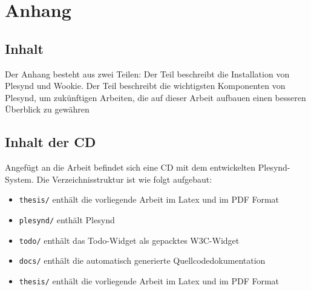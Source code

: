 
\chapter{Anhang}
\label{AppendixA}

\section{Inhalt} 
Der Anhang besteht aus zwei Teilen: Der Teil  beschreibt die Installation von Plesynd und Wookie. Der Teil  beschreibt die wichtigsten Komponenten von Plesynd, um zukünftigen Arbeiten, die auf dieser Arbeit aufbauen einen besseren Überblick zu gewähren

\section{Inhalt der CD}
Angefügt an die Arbeit befindet sich eine CD mit dem entwickelten Plesynd-System. Die Verzeichnisstruktur ist wie folgt aufgebaut:
\begin{itemize}
 \item \texttt{thesis/} enthält die vorliegende Arbeit im Latex und im PDF Format
 \item \texttt{plesynd/} enthält Plesynd
 \item \texttt{todo/} enthält das Todo-Widget als gepacktes W3C-Widget
 \item \texttt{docs/} enthält die automatisch generierte Quellcodedokumentation
 \item \texttt{thesis/} enthält die vorliegende Arbeit im Latex und im PDF Format
\end{itemize}
